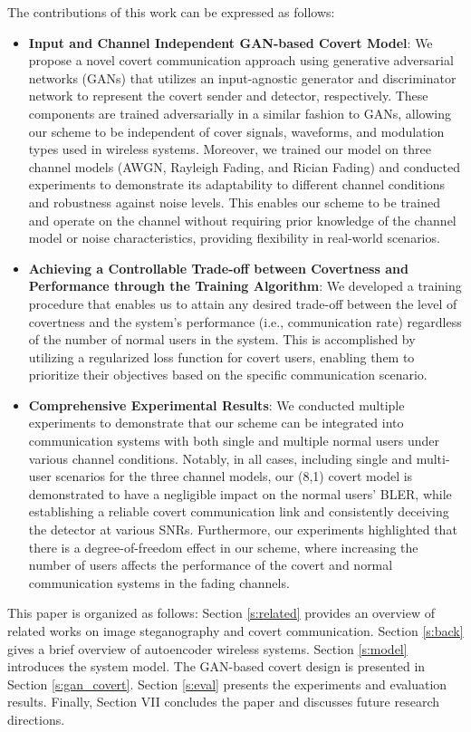 The contributions of this work can be expressed as follows:
\begin{itemize}
	\item \textbf{Input and Channel Independent GAN-based Covert Model}: We propose a novel covert communication approach using generative adversarial networks (GANs) that utilizes an input-agnostic generator and discriminator network to represent the covert sender and detector, respectively. These components are trained adversarially in a similar fashion to GANs, allowing our scheme to be independent of cover signals, waveforms, and modulation types used in wireless systems. Moreover, we trained our model on three channel models (AWGN, Rayleigh Fading, and Rician Fading) and conducted experiments to demonstrate its adaptability to different channel conditions and robustness against noise levels. This enables our scheme to be trained and operate on the channel without requiring prior knowledge of the channel model or noise characteristics, providing flexibility in real-world scenarios.
	\item \textbf{Achieving a Controllable Trade-off between Covertness and Performance through the Training Algorithm}: We developed a training procedure that enables us to attain any desired trade-off between the level of covertness and the system's performance (i.e., communication rate) regardless of the number of normal users in the system. This is accomplished by utilizing a regularized loss function for covert users, enabling them to prioritize their objectives based on the specific communication scenario.
	\item \textbf{Comprehensive Experimental Results}: We conducted multiple experiments to demonstrate that our scheme can be integrated into communication systems with both single and multiple normal users under various channel conditions. Notably, in all cases, including single and multi-user scenarios for the three channel models, our (8,1) covert model is demonstrated to have a negligible impact on the normal users' BLER, while establishing a reliable covert communication link and consistently deceiving the detector at various SNRs. Furthermore, our experiments highlighted that there is a degree-of-freedom effect in our scheme, where increasing the number of users affects the performance of the covert and normal communication systems in the fading channels.
\end{itemize}


This paper is organized as follows: Section \ref{s:related} provides an overview of related works on image steganography and covert communication. Section \ref{s:back} gives a brief overview of autoencoder wireless systems. Section \ref{s:model} introduces the system model. The GAN-based covert design is presented in Section \ref{s:gan_covert}. Section \ref{s:eval} presents the experiments and evaluation results. Finally, Section VII concludes the paper and discusses future research directions.
